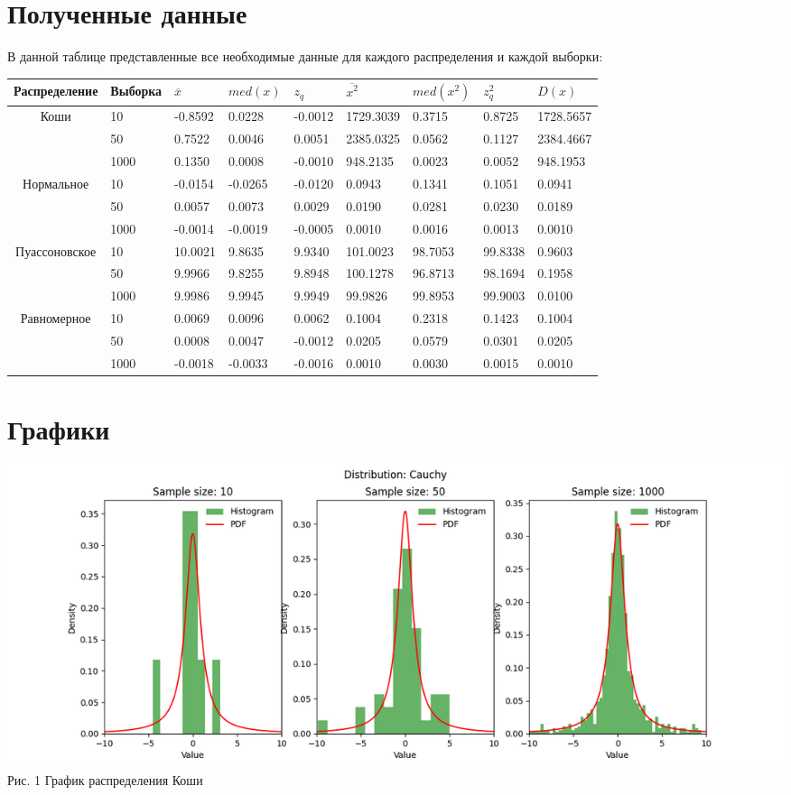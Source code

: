 \documentclass[12pt]{article}
\begin{document}
\section{Полученные данные}
В данной таблице представленные все необходимые данные для каждого распределения и каждой выборки:\\
\begin{tabular}{|c|l|l|l|l|l|l|l|l|}
	\hline
	Распределение & Выборка & $\overline{x}$ & $med(x)$  & $z_q$ & $\overline{x^2}$ & $med(x^2)$ & $z_q^2$ & $D(x)$ \\
	\hline
	Коши & 10 & -0.8592 & 0.0228 & -0.0012 & 1729.3039 & 0.3715 & 0.8725 & 1728.5657 \\
	\hline
	   \ & 50 & 0.7522 & 0.0046 & 0.0051 & 2385.0325 & 0.0562 & 0.1127 & 2384.4667 \\
	\hline
	   \ & 1000 & 0.1350 & 0.0008 & -0.0010 & 948.2135 & 0.0023 & 0.0052 & 948.1953 \\
	\hline
		Нормальное & 10 & -0.0154 & -0.0265 & -0.0120 & 0.0943 & 0.1341 & 0.1051 & 0.0941 \\
	\hline
		\ & 50 & 0.0057 & 0.0073 & 0.0029 & 0.0190 & 0.0281 & 0.0230 & 0.0189 \\
	\hline
		\ & 1000 & -0.0014 & -0.0019 & -0.0005 & 0.0010 & 0.0016 & 0.0013 & 0.0010 \\
	\hline
		Пуассоновское & 10 & 10.0021 & 9.8635 & 9.9340 & 101.0023 & 98.7053 & 99.8338 & 0.9603 \\
	\hline
		\ & 50 & 9.9966 & 9.8255 & 9.8948 & 100.1278 & 96.8713 & 98.1694 & 0.1958 \\
	\hline
		\ & 1000 & 9.9986 & 9.9945 & 9.9949 & 99.9826 & 99.8953 & 99.9003 & 0.0100 \\
	\hline
		Равномерное & 10 & 0.0069 & 0.0096 & 0.0062 & 0.1004 & 0.2318 & 0.1423 & 0.1004 \\
	\hline
		\ & 50 & 0.0008 & 0.0047 & -0.0012 & 0.0205 & 0.0579 & 0.0301 & 0.0205 \\
	\hline
		\ & 1000 & -0.0018 & -0.0033 & -0.0016 & 0.0010 & 0.0030 & 0.0015 & 0.0010 \\
	\hline

\end{tabular}

\section{Графики}

\begin{center}
    \includegraphics[scale=0.65]{lab_1_Cauchy.png} \\
    Рис. 1 График распределения Коши
\end{center}
\end{document}

